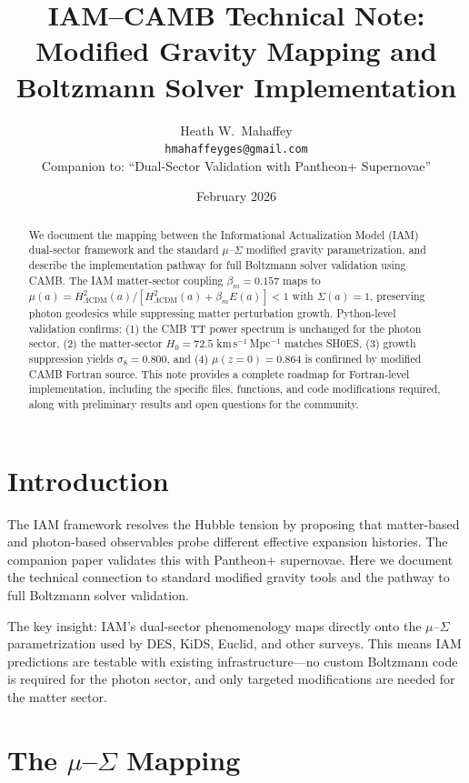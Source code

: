 \documentclass[11pt,letterpaper]{article}
\title{IAM--CAMB Technical Note:\\
Modified Gravity Mapping and Boltzmann Solver Implementation}
\author{Heath W.\ Mahaffey\\
\texttt{hmahaffeyges@gmail.com}\\[4pt]
\small{Companion to: ``Dual-Sector Validation with Pantheon+ Supernovae''}}
\date{February 2026}
\begin{document}
\maketitle

\begin{abstract}
We document the mapping between the Informational Actualization Model (IAM) dual-sector framework and the standard $\mu$--$\Sigma$ modified gravity parametrization, and describe the implementation pathway for full Boltzmann solver validation using CAMB. The IAM matter-sector coupling $\beta_m = 0.157$ maps to $\mu(a) = H^2_{\Lambda\text{CDM}}(a) / [H^2_{\Lambda\text{CDM}}(a) + \beta_m E(a)] < 1$ with $\Sigma(a) = 1$, preserving photon geodesics while suppressing matter perturbation growth. Python-level validation confirms: (1) the CMB TT power spectrum is unchanged for the photon sector, (2) the matter-sector $H_0 = 72.5$ km\,s$^{-1}$\,Mpc$^{-1}$ matches SH0ES, (3) growth suppression yields $\sigma_8 = 0.800$, and (4) $\mu(z=0) = 0.864$ is confirmed by modified CAMB Fortran source. This note provides a complete roadmap for Fortran-level implementation, including the specific files, functions, and code modifications required, along with preliminary results and open questions for the community.
\end{abstract}

\tableofcontents

\section{Introduction}

The IAM framework resolves the Hubble tension by proposing that matter-based and photon-based observables probe different effective expansion histories. The companion paper \cite{DualSector2026} validates this with Pantheon+ supernovae. Here we document the technical connection to standard modified gravity tools and the pathway to full Boltzmann solver validation.

The key insight: IAM's dual-sector phenomenology maps directly onto the $\mu$--$\Sigma$ parametrization used by DES, KiDS, Euclid, and other surveys. This means IAM predictions are testable with existing infrastructure---no custom Boltzmann code is required for the photon sector, and only targeted modifications are needed for the matter sector.

\section{The $\mu$--$\Sigma$ Mapping}
\end{document}
